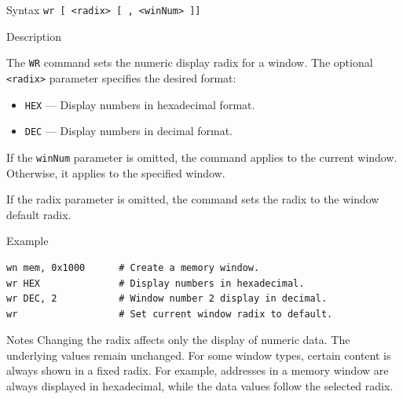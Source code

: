 %
%
\pagebreak
{}

\begin{iPageDescEntry}{Syntax}
\texttt{wr [ <radix> [ , <winNum> ]]} \\
\end{iPageDescEntry}

\begin{iPageDescEntry}{Description}

The \texttt{WR} command sets the numeric display radix for a window.  
The optional \texttt{<radix>} parameter specifies the desired format:
\begin{itemize}
    \item \texttt{HEX} — Display numbers in hexadecimal format.
    \item \texttt{DEC} — Display numbers in decimal format.
\end{itemize}

If the \texttt{winNum} parameter is omitted, the command applies to the current
window. Otherwise, it applies to the specified window.

If the radix parameter is omitted, the command sets the radix to the window default radix.

\end{iPageDescEntry}

\begin{iPageDescOpEntry}{Example}
\begin{lstlisting}[style=iPageOpStyle]
wn mem, 0x1000      # Create a memory window.
wr HEX              # Display numbers in hexadecimal.
wr DEC, 2           # Window number 2 display in decimal.
wr                  # Set current window radix to default.
\end{lstlisting}
\end{iPageDescOpEntry}

\begin{iPageDescEntry}{Notes}
Changing the radix affects only the display of numeric data. The underlying values remain unchanged. For some window types, certain content is always shown in a fixed radix. For example, addresses in a memory window are always displayed in hexadecimal, while the data values follow the selected radix.
\end{iPageDescEntry}
